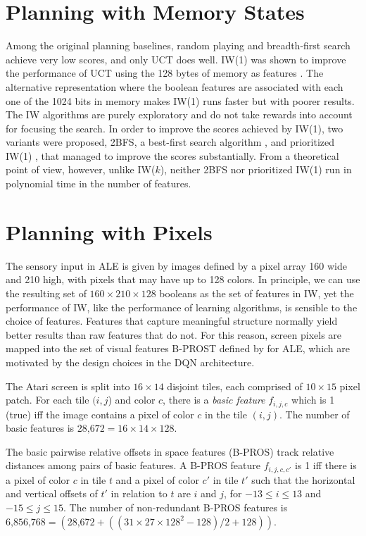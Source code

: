 \documentclass[letterpaper]{article}
\begin{document}
\section{Planning  with Memory  States}

Among the  original planning baselines,
random playing and breadth-first search
achieve very  low scores, and only UCT \cite{uct}
does well.  IW(1) was shown to improve the performance
of UCT using the 128 bytes of memory as features \cite{nir:ijcai2015}.
The alternative representation where the boolean features
are associated with each one of the  1024 bits in memory
makes  IW(1)  runs  faster but with poorer results.
The IW algorithms  are purely exploratory  and do not take rewards into account
for focusing the search. In order  to improve the scores achieved by IW(1),
two variants  were proposed,  2BFS, a best-first search algorithm
\cite{nir:ijcai2015}, and prioritized IW(1)  \cite{carmel:ijcai2016},
that managed to improve the scores substantially.  From a theoretical point of view,
however, unlike  IW($k$), neither 2BFS nor prioritized IW(1) run in polynomial time in the number of features.

\section{Planning with Pixels}

The sensory input in ALE is given by images defined by a pixel array 160 wide and 210 high, with
pixels that  may have up to 128 colors. In principle, we can use the resulting set of
$160 \times 210 \times 128$ booleans
as the set of features in IW, yet
the performance of IW, like the performance of learning algorithms,
is sensible to the choice of features. Features that capture
meaningful structure  normally yield better results than raw
features that do not. For this reason, screen pixels are mapped  into the
set of visual features B-PROST defined by \citeauthor{shallow} for ALE, %
which are motivated by the design choices in the DQN architecture.

The Atari screen is split into $16 \times 14$ disjoint tiles, each comprised of  $10 \times 15$  pixel patch.
For each tile $(i,j$) and color $c$, there is a \emph{basic feature}
$f_{i,j,c}$ which is 1 (true) iff the image contains a
pixel of color $c$ in the tile $(i,j)$.
The number of basic features is $\text{28,672} = 16 \times 14 \times 128$.

The basic pairwise relative offsets in space  features (B-PROS)
track relative distances among pairs of basic features.
A  B-PROS feature $f_{i,j,c,c'}$ is 1  iff there is a  pixel of color $c$ in tile $t$ and a pixel of color $c'$ in tile
$t'$ such that the horizontal and vertical offsets of  $t'$ in relation to $t$
are $i$ and $j$, for $-13 \leq i \leq 13$ and $-15 \leq j \leq 15$.
The number of non-redundant B-PROS features is
$\text{6,856,768} = (\text{28,672} + ((31 \times 27 \times 128^2 - 128)/2 + 128))$.
\end{document}
